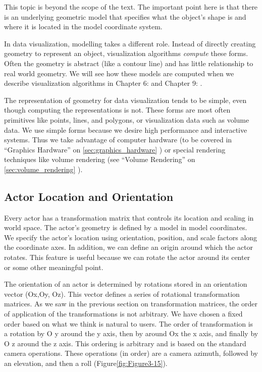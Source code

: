 This topic is beyond the scope of the text. The important point here is that there is an underlying geometric model that specifies what the object's shape is and where it is located in the model coordinate system.

In data visualization, modelling takes a different role. Instead of directly creating geometry to represent an object, visualization algorithms \emph{compute} these forms. Often the geometry is abstract (like a contour line) and has little relationship to real world geometry. We will see how these models are computed when we describe visualization algorithms in Chapter 6:  and Chapter 9: .

The representation of geometry for data visualization tends to be simple, even though computing the representations is not. These forms are most often primitives like points, lines, and polygons, or visualization data such as volume data. We use simple forms because we desire high performance and interactive systems. Thus we take advantage of computer hardware (to be covered in ``Graphics Hardware'' on \ref{sec:graphics_hardware} ) or special rendering techniques like volume rendering (see ``Volume Rendering'' on \ref{sec:volume_rendering} ).

\subsection{Actor Location and Orientation}

Every actor has a transformation matrix that controls its location and scaling in world space. The actor's geometry is defined by a model in model coordinates. We specify the actor's location using orientation, position, and scale factors along the coordinate axes. In addition, we can define an origin around which the actor rotates. This feature is useful because we can rotate the actor around its center or some other meaningful point.

The orientation of an actor is determined by rotations stored in an orientation vector (Ox,Oy, Oz). This vector defines a series of rotational transformation matrices. As we saw in the previous section on transformation matrices, the order of application of the transformations is not arbitrary. We have chosen a fixed order based on what we think is natural to users. The order of transformation is a rotation by O y around the y axis, then by around Ox the x axis, and finally by O z around the z axis. This ordering is arbitrary and is based on the standard camera operations. These operations (in order) are a camera azimuth, followed by an elevation, and then a roll (Figure\ref{fig:Figure3-15}).

